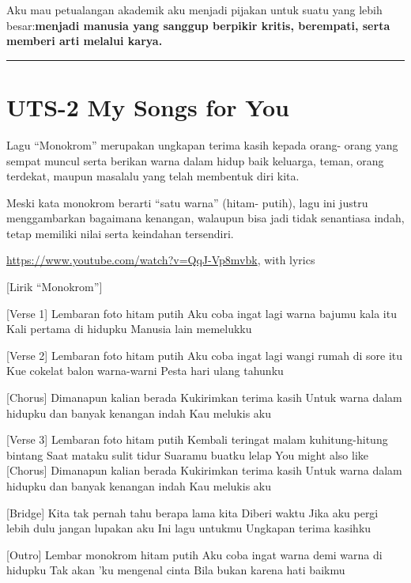 \documentclass[
  letterpaper,
  DIV=11,
  numbers=noendperiod]{scrreprt}
\begin{document}
Aku mau petualangan akademik aku menjadi pijakan untuk suatu yang lebih
besar:\textbf{menjadi manusia yang sanggup berpikir kritis, berempati,
serta memberi arti melalui karya.}

\begin{center}\rule{0.5\linewidth}{0.5pt}\end{center}


\chapter{UTS-2 My Songs for You}\label{uts-2-my-songs-for-you}

Lagu ``Monokrom'' merupakan ungkapan terima kasih kepada orang- orang
yang sempat muncul serta berikan warna dalam hidup baik keluarga, teman,
orang terdekat, maupun masalalu yang telah membentuk diri kita.

Meski kata monokrom berarti ``satu warna'' (hitam- putih), lagu ini
justru menggambarkan bagaimana kenangan, walaupun bisa jadi tidak
senantiasa indah, tetap memiliki nilai serta keindahan tersendiri.

\url{https://www.youtube.com/watch?v=QqJ-Vp8mvbk}, with lyrics

{[}Lirik ``Monokrom''{]}

{[}Verse 1{]} Lembaran foto hitam putih Aku coba ingat lagi warna bajumu
kala itu Kali pertama di hidupku Manusia lain memelukku

{[}Verse 2{]} Lembaran foto hitam putih Aku coba ingat lagi wangi rumah
di sore itu Kue cokelat balon warna-warni Pesta hari ulang tahunku

{[}Chorus{]} Dimanapun kalian berada Kukirimkan terima kasih Untuk warna
dalam hidupku dan banyak kenangan indah Kau melukis aku

{[}Verse 3{]} Lembaran foto hitam putih Kembali teringat malam
kuhitung-hitung bintang Saat mataku sulit tidur Suaramu buatku lelap You
might also like {[}Chorus{]} Dimanapun kalian berada Kukirimkan terima
kasih Untuk warna dalam hidupku dan banyak kenangan indah Kau melukis
aku

{[}Bridge{]} Kita tak pernah tahu berapa lama kita Diberi waktu Jika aku
pergi lebih dulu jangan lupakan aku Ini lagu untukmu Ungkapan terima
kasihku

{[}Outro{]} Lembar monokrom hitam putih Aku coba ingat warna demi warna
di hidupku Tak akan 'ku mengenal cinta Bila bukan karena hati baikmu
\end{document}
